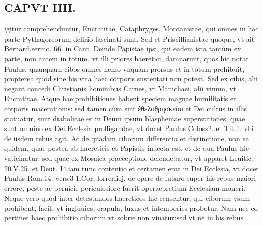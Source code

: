 \documentclass{article}
\begin{document}
\begin{pages}
\section*{CAPVT  IIII. }
\marginpar{[ p.189 ]}\pstart igitur comprehenduntur, Encratitae, Cataphryges, Montanistae, qui omnes in hac parte Pythagoreorum delirio fascinati sunt. Sed et Priscillianistae quoque, vt ait Bernard.sermo. 66. in Cant. Deinde Papistae ipsi, qui eadem ista tantùm ex parte, non autem in totum, vt illi priores haeretici, damnarunt, quos hic notat Paulus: quanquam cibos omnes nemo vnquam prorsus et in totum prohibuit, propterea quod sine his vita haec corporis sustentari non potest. Sed ex cibis, alii negaut concedi Christianis hominibus Carnes, vt Manichaei, alii vinum, vt Encratitae. Atque  hae prohibitiones habent speciem magnae humilitatis et corporis macerationis: sed tamen cùm sint ἐθελοθρησκείαι et Dei cultus in illis statuatur, sunt diabolicae et in Deum ipsum blasphemae superstitiones, quae sunt omnino ex Dei Ecclesia profligandae, vt docet Paulus Coloss2. et Tit.1. vbi de iisdem rebus agit. Ac de quadam ciborum differentia et distinctione, non ea quidem, quae postea ab haereticis et Papistis inuecta est, et de qua Paulus hic vaticinatur: sed quae ex Mosaica praeceptione defendebatur, vt apparet Leuitic. 20.V.25. et Deut. I4.iam tunc contentio et certamen erat in Dei Ecclesia, vt docet Paulus Rom.14. vers.3 1.Cor. lorrerliej, de eprre de futuro super his rebus maiori errore, peste ac pernicie periculosiore fuerit operaepretium Ecclesiam moneri. Neque vero quod inter detestandos haereticos hic censentur, qui ciborum vsum prohibent, facit, vt ingluuies, crapula, luxus et intemperies probetur. Nam nec eo pertinet haec prohibitio ciborum vt sobrie non viuatur:sed vt ne in his rebus  \pend

\end{pages}
\end{document}
